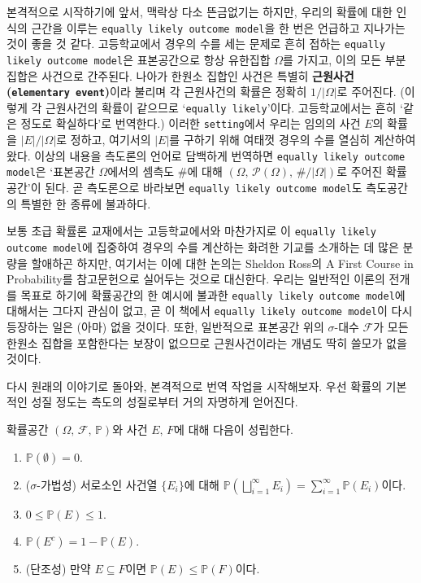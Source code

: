 본격적으로 시작하기에 앞서, 맥락상 다소 뜬금없기는 하지만, 우리의 확률에 대한 인식의 근간을 이루는 \texttt{equally likely outcome model}을 한 번은 언급하고 지나가는 것이 좋을 것 같다. 고등학교에서 경우의 수를 세는 문제로 흔히 접하는 \texttt{equally likely outcome model}은 표본공간으로 항상 유한집합 $\Omega$를 가지고, 이의 모든 부분집합은 사건으로 간주된다. 나아가 한원소 집합인 사건은 특별히 \textbf{근원사건(\texttt{elementary event})}이라 불리며 각 근원사건의 확률은 정확히 $1/|\Omega|$로 주어진다. (이렇게 각 근원사건의 확률이 같으므로 `\texttt{equally likely}'이다. 고등학교에서는 흔히 `같은 정도로 확실하다'로 번역한다.) 이러한 \texttt{setting}에서 우리는 임의의 사건 $E$의 확률을 $|E|/|\Omega|$로 정하고, 여기서의 $|E|$를 구하기 위해 여태껏 경우의 수를 열심히 계산하여 왔다. 이상의 내용을 측도론의 언어로 담백하게 번역하면 \texttt{equally likely outcome model}은 `표본공간 $\Omega$에서의 셈측도 $\#$에 대해 $(\Omega,\,\mathcal{P}(\Omega),\,\#/|\Omega|)$로 주어진 확률공간'이 된다. 곧 측도론으로 바라보면 \texttt{equally likely outcome model}도 측도공간의 특별한 한 종류에 불과하다.

보통 초급 확률론 교재에서는 고등학교에서와 마찬가지로 이 \texttt{equally likely outcome model}에 집중하여 경우의 수를 계산하는 화려한 기교를 소개하는 데 많은 분량을 할애하곤 하지만, 여기서는 이에 대한 논의는 Sheldon Ross의 A First Course in Probability를 참고문헌으로 실어두는 것으로 대신한다. 우리는 일반적인 이론의 전개를 목표로 하기에 확률공간의 한 예시에 불과한 \texttt{equally likely outcome model}에 대해서는 그다지 관심이 없고, 곧 이 책에서 \texttt{equally likely outcome model}이 다시 등장하는 일은 (아마) 없을 것이다. 또한, 일반적으로 표본공간 위의 $\sigma$-대수 $\mathcal{F}$가 모든 한원소 집합을 포함한다는 보장이 없으므로 근원사건이라는 개념도 딱히 쓸모가 없을 것이다.

다시 원래의 이야기로 돌아와, 본격적으로 번역 작업을 시작해보자. 우선 확률의 기본적인 성질 정도는 측도의 성질로부터 거의 자명하게 얻어진다.

\begin{theorem}
    확률공간 $(\Omega,\,\mathcal{F},\,\mathbb{P})$와 사건 $E,\,F$에 대해 다음이 성립한다.
    \begin{enumerate}
        \item $\mathbb{P}(\emptyset)=0$.
        \item ($\sigma$-가법성) 서로소인 사건열 $\{E_i\}$에 대해 $\mathbb{P}(\bigsqcup_{i=1}^\infty E_i)=\sum_{i=1}^\infty\mathbb{P}(E_i)$이다.
        \item $0\leq\mathbb{P}(E)\leq1$.
        \item $\mathbb{P}(E^c)=1-\mathbb{P}(E)$.
        \item (단조성) 만약 $E\subseteq F$이면 $\mathbb{P}(E)\leq\mathbb{P}(F)$이다.
    \end{enumerate}
\end{theorem}

